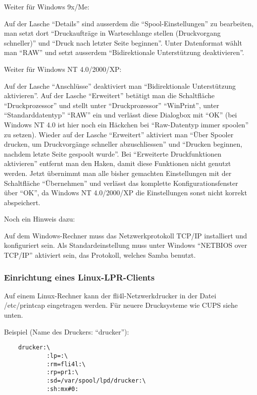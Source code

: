 \begin{enumerate}
    Weiter für Windows 9x/Me:

    Auf der Lasche ``Details'' sind ausserdem die ``Spool-Einstellungen'' zu
    bearbeiten, man setzt dort ``Druckaufträge in Warteschlange stellen
    (Druckvorgang schneller)'' und ``Druck nach letzter Seite beginnen''.
    Unter Datenformat wählt man ``RAW'' und setzt ausserdem ``Bidirektionale
    Unterstützung deaktivieren''.

    Weiter für Windows NT 4.0/2000/XP:

    Auf der Lasche ``Anschlüsse'' deaktiviert man ``Bidirektionale
    Unterstützung aktivieren''. Auf der Lasche ``Erweitert'' betätigt man die
    Schaltfläche ``Druckprozessor'' und stellt unter ``Druckprozessor''
    ``WinPrint'', unter ``Standarddatentyp'' ``RAW'' ein und verlässt diese
    Dialogbox mit ``OK'' (bei Windows NT 4.0 ist hier noch ein Häckchen bei
    ``Raw-Datentyp immer spoolen'' zu setzen). Wieder auf der Lasche
    ``Erweitert'' aktiviert man ``Über Spooler drucken, um Druckvorgänge
    schneller abzuschliessen'' und ``Drucken beginnen, nachdem letzte Seite
    gespoolt wurde''. Bei ``Erweiterte Druckfunktionen aktivieren'' entfernt
    man den Haken, damit diese Funktionen nicht genutzt werden. Jetzt
    übernimmt man alle bisher gemachten Einstellungen mit der Schaltfläche
    ``Übernehmen'' und verlässt das komplette Konfigurationsfenster über ``OK'',
    da Windows NT 4.0/2000/XP die Einstellungen sonst nicht korrekt
    abspeichert.


    Noch ein Hinweis dazu:

    Auf dem Windows-Rechner muss das Netzwerkprotokoll TCP/IP installiert
    und konfiguriert sein. Als Standardeinstellung muss unter Windows
    ``NETBIOS over TCP/IP'' aktiviert sein, das Protokoll, welches Samba benutzt.


\end{enumerate}
\subsubsection{Einrichtung eines Linux-LPR-Clients}

    Auf einem Linux-Rechner kann der fli4l-Netzwerkdrucker in der Datei
    /etc/printcap eingetragen werden. Für neuere Drucksysteme wie CUPS siehe unten.

    Beispiel (Name des Druckers: ``drucker''):

\begin{example}
\begin{verbatim}
    drucker:\
            :lp=:\
            :rm=fli4l:\
            :rp=pr1:\
            :sd=/var/spool/lpd/drucker:\
            :sh:mx#0:
\end{verbatim}
\end{example}

